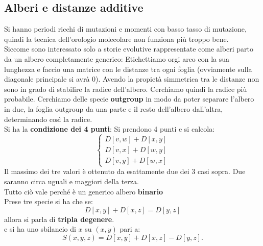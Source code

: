 \documentclass[a4paper,12pt, oneside]{book}
\begin{document}
\subsection{Alberi e distanze additive}
Si hanno periodi ricchi di mutazioni e momenti con basso tasso di
mutazione, quindi la tecnica dell'orologio molecolare non funziona più
troppo bene. \\
Siccome sono interessato solo a storie evolutive rappresentate come
alberi parto da un albero completamente generico:
Etichettiamo orgi arco con la sua lunghezza e faccio una matrice con
le distanze tra ogni foglia (ovviamente sulla diagonale principale si
avrà 0). Avendo la propietà simmetrica tra le distanze non sono in
grado di stabilire la radice dell'albero. Cerchiamo quindi la radice
più probabile. Cerchiamo delle specie \textbf{outgroup} in modo da
poter separare l'albero in due, la foglia outgroup da una parte e il
resto dell'albero dall'altra, determinando così la radice. \\
Si ha la \textbf{condizione dei 4 punti}:
Si prendono 4 punti e si calcola:
\[
  \begin{cases}
    D[v,w]+D[x,y]\\
    D[v,x]+D[w,y]\\
    D[v,y]+D[w,x]
  \end{cases}
\]
Il massimo dei tre valori è ottenuto da esattamente due dei 3 casi
sopra. Due saranno circa uguali e maggiori della terza.\\
Tutto ciò vale perché è un generico albero \textbf{binario}\\
Prese tre specie si ha che se:
\[D[x, y] + D[x, z] = D[ y, z]\]
allora si parla di \textbf{tripla degenere}.\\
e si ha uno sbilancio di $x$ su $(x,y)$ pari a:
\[S(x, y, z) = D[x, y] + D[x, z] − D[ y, z].\]
\end{document}
